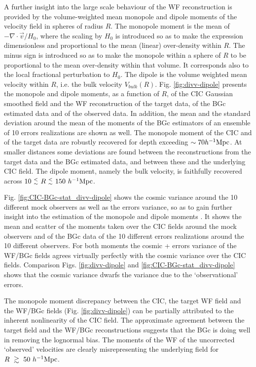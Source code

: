 \documentclass[useAMS,usenatbib]{mn2e}
\def\lesssim{{^<_\sim}}
\newcommand{\hmpc}{{\ifmmode{h^{-1}{\rm Mpc}}\else{$h^{-1}$Mpc}\fi}}
\begin{document}
A further insight into the large scale behaviour of the WF reconstruction is provided by the volume-weighted mean monopole and dipole moments of the velocity field in spheres of radius $R$.
The monopole moment is  the  mean of    $-\nabla\cdot\vec{v}/H_0$, where the  scaling by $H_0$ is introduced so as to make the expression dimensionless and proportional to the mean (linear) over-density within $R$. The minus  sign is introduced so as to make   the monopole within a sphere of $R$  to be proportional to the mean  over-density within  that volume.
It corresponds  also to the   local fractional perturbation to $H_0$. The dipole  is the volume weighted mean velocity within $R$, i.e. the bulk velocity $V_{bulk}(R)$. 
Fig. \ref{fig:divv-dipole} presents the monopole and dipole moments, as a function of $R$, of the CIC Gaussian smoothed field and the WF reconstruction of the target data, of the BGc estimated data and of the  observed data. In addition, the mean and the standard deviation around the mean of the moments of the BGc estimators of an ensemble of 10 errors realizations are shown as well.  The monopole moment of the CIC and of the target data are robustly recovered for depth exceeding $\sim70\hmpc$. At smaller distances some deviations are found between the reconstructions from the target data and the BGc estimated data, and between these and the underlying CIC field. The dipole moment, namely the bulk velocity, is faithfully recovered across $10\ \lesssim\ R\  \lesssim \ 150\  \hmpc$. 

Fig. \ref{fig:CIC-BGc-stat_divv-dipole}  shows the cosmic variance around the 10 different mock observers as well as the errors variance, so as to gain further insight into the estimation of the monopole and dipole moments   . It shows  the mean and scatter of the moments taken over the CIC fields around the mock observers and of the BGc data of the 10 different errors realizations around the 10 different observers. For both moments the cosmic + errors variance of the WF/BGc fields agrees virtually perfectly with the cosmic variance over the CIC fields. Comparison Figs. \ref{fig:divv-dipole}  and \ref{fig:CIC-BGc-stat_divv-dipole} shows that the cosmic variance dwarfs the variance due to the `observational' errors.  

The monopole moment discrepancy between the CIC, the target WF field and the WF/BGc fields (Fig. \ref{fig:divv-dipole}) can be partially attributed to the inherent nonlinearity of the CIC field.
The approximate  agreement between  the target field and the WF/BGc reconstructions  suggests that the BGc is doing well in removing the  lognormal bias. The moments of the WF  of the uncorrected `observed' velocities are clearly  misrepresenting the underlying field for $ R\  \gtrsim \ 50\  \hmpc$. 
\end{document}
